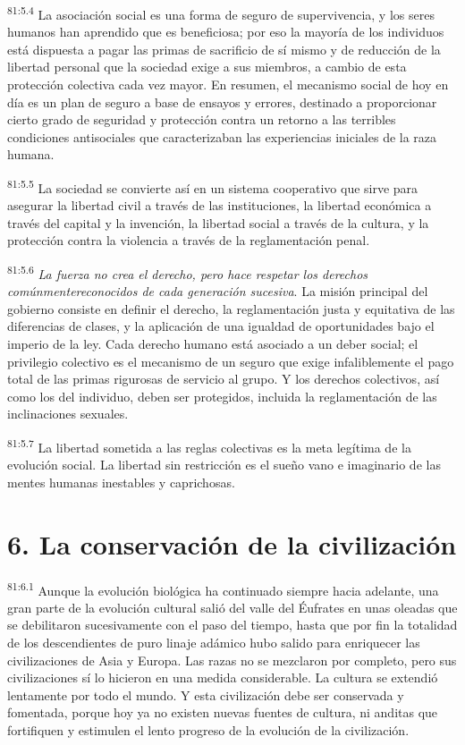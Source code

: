 \documentclass[twoside, 11pt]{book}
\begin{document}
\par
\textsuperscript{81:5.4} La asociación social es una forma de seguro de supervivencia, y los seres humanos han aprendido que es beneficiosa; por eso la mayoría de los individuos está dispuesta a pagar las primas de sacrificio de sí mismo y de reducción de la libertad personal que la sociedad exige a sus miembros, a cambio de esta protección colectiva cada vez mayor. En resumen, el mecanismo social de hoy en día es un plan de seguro a base de ensayos y errores, destinado a proporcionar cierto grado de seguridad y protección contra un retorno a las terribles condiciones antisociales que caracterizaban las experiencias iniciales de la raza humana.

\par
\textsuperscript{81:5.5} La sociedad se convierte así en un sistema cooperativo que sirve para asegurar la libertad civil a través de las instituciones, la libertad económica a través del capital y la invención, la libertad social a través de la cultura, y la protección contra la violencia a través de la reglamentación penal.

\par
\textsuperscript{81:5.6} \textit{La fuerza no crea el derecho, pero hace respetar los derechos comúnmentereconocidos de cada generación sucesiva}. La misión principal del gobierno consiste en definir el derecho, la reglamentación justa y equitativa de las diferencias de clases, y la aplicación de una igualdad de oportunidades bajo el imperio de la ley. Cada derecho humano está asociado a un deber social; el privilegio colectivo es el mecanismo de un seguro que exige infaliblemente el pago total de las primas rigurosas de servicio al grupo. Y los derechos colectivos, así como los del individuo, deben ser protegidos, incluida la reglamentación de las inclinaciones sexuales.

\par
\textsuperscript{81:5.7} La libertad sometida a las reglas colectivas es la meta legítima de la evolución social. La libertad sin restricción es el sueño vano e imaginario de las mentes humanas inestables y caprichosas.

\section*{6. La conservación de la civilización}
\par
\textsuperscript{81:6.1} Aunque la evolución biológica ha continuado siempre hacia adelante, una gran parte de la evolución cultural salió del valle del Éufrates en unas oleadas que se debilitaron sucesivamente con el paso del tiempo, hasta que por fin la totalidad de los descendientes de puro linaje adámico hubo salido para enriquecer las civilizaciones de Asia y Europa. Las razas no se mezclaron por completo, pero sus civilizaciones sí lo hicieron en una medida considerable. La cultura se extendió lentamente por todo el mundo. Y esta civilización debe ser conservada y fomentada, porque hoy ya no existen nuevas fuentes de cultura, ni anditas que fortifiquen y estimulen el lento progreso de la evolución de la civilización.
\end{document}
